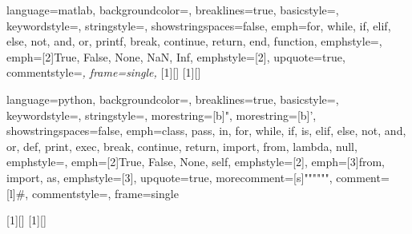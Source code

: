  {%
language=matlab,
backgroundcolor=\color[gray]{0.9},
breaklines=true,
basicstyle=\ttfamily\small,
keywordstyle=\color{blue},
stringstyle=\color{darkgreen},
showstringspaces=false,
emph={for, while, if, elif, else, not, and, or, printf, break, continue, return, end, function},
emphstyle=\color{blue},
emph={[2]True, False, None, NaN, Inf},
emphstyle=[2]\color{key},
upquote=true,
commentstyle=\color{gray}\slshape,
frame=single,
}
\newcommand{\imatlab}[1]{\lstset{language=fooMatlab,basicstyle=\color[gray]{0.6}}\lstinline|#1|}
[1][]{}{} 
[1][]{\lstset{language=fooMatlab,#1}}{} 
\newcommand{\matinput}[1]{\lstset{language=fooMatlab}}

 {%
language=python,
backgroundcolor=\color[gray]{0.7},
breaklines=true,
basicstyle=\ttfamily\small,
keywordstyle=\color{blue},
stringstyle=\color{darkgreen},
morestring=[b]",%
morestring=[b]',%
showstringspaces=false,
emph={class, pass, in, for, while, if, is, elif, else, not, and, or,
def, print, exec, break, continue, return, import, from, lambda, null},
emphstyle=\color{blue},
emph={[2]True, False, None, self},
emphstyle=[2]\color{key},
emph={[3]from, import, as},
emphstyle=[3]\color{blue},
upquote=true,
morecomment=[s]{"""}{"""},
comment=[l]{\#},
commentstyle=\color{gray},
frame=single
}

\newcommand{\pyinput}[1]{\lstset{language=fooPython}}
\newcommand{\isage}[1]{\lstset{language=fooPython,basicstyle=\color[gray]{0.3}}\lstinline|#1|}

[1][]{}{}
[1][]{\lstset{language=fooPython,#1}}{}


